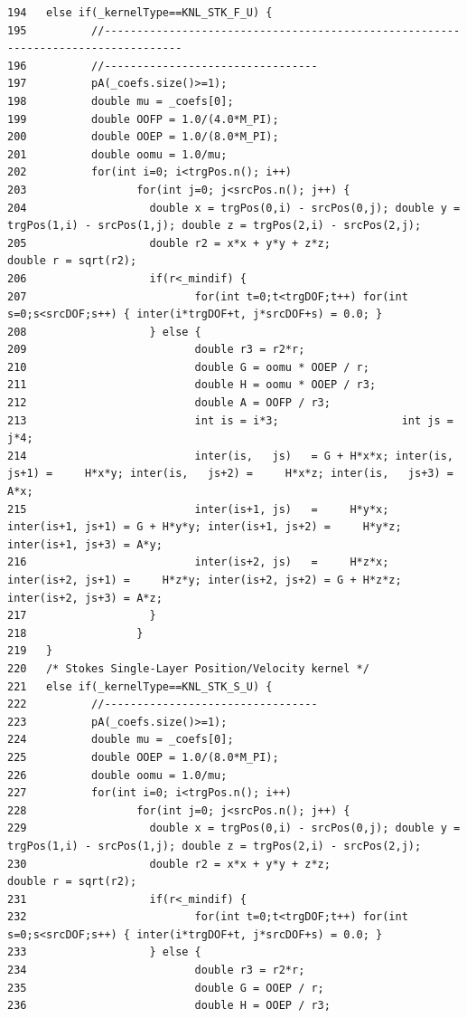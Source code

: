 \begin{verbatim}
194   else if(_kernelType==KNL_STK_F_U) {
195          //----------------------------------------------------------------------------------
196          //---------------------------------
197          pA(_coefs.size()>=1);
198          double mu = _coefs[0];
199          double OOFP = 1.0/(4.0*M_PI);
200          double OOEP = 1.0/(8.0*M_PI);
201          double oomu = 1.0/mu;
202          for(int i=0; i<trgPos.n(); i++)
203                 for(int j=0; j<srcPos.n(); j++) {
204                   double x = trgPos(0,i) - srcPos(0,j); double y = trgPos(1,i) - srcPos(1,j); double z = trgPos(2,i) - srcPos(2,j);
205                   double r2 = x*x + y*y + z*z;                    double r = sqrt(r2);
206                   if(r<_mindif) {
207                          for(int t=0;t<trgDOF;t++) for(int s=0;s<srcDOF;s++) { inter(i*trgDOF+t, j*srcDOF+s) = 0.0; }
208                   } else {
209                          double r3 = r2*r;
210                          double G = oomu * OOEP / r;
211                          double H = oomu * OOEP / r3;
212                          double A = OOFP / r3;
213                          int is = i*3;                   int js = j*4;
214                          inter(is,   js)   = G + H*x*x; inter(is,   js+1) =     H*x*y; inter(is,   js+2) =     H*x*z; inter(is,   js+3) = A*x;
215                          inter(is+1, js)   =     H*y*x; inter(is+1, js+1) = G + H*y*y; inter(is+1, js+2) =     H*y*z; inter(is+1, js+3) = A*y;
216                          inter(is+2, js)   =     H*z*x; inter(is+2, js+1) =     H*z*y; inter(is+2, js+2) = G + H*z*z; inter(is+2, js+3) = A*z;
217                   }
218                 }
219   }
220   /* Stokes Single-Layer Position/Velocity kernel */
221   else if(_kernelType==KNL_STK_S_U) {
222          //---------------------------------
223          pA(_coefs.size()>=1);
224          double mu = _coefs[0];
225          double OOEP = 1.0/(8.0*M_PI);
226          double oomu = 1.0/mu;
227          for(int i=0; i<trgPos.n(); i++)
228                 for(int j=0; j<srcPos.n(); j++) {
229                   double x = trgPos(0,i) - srcPos(0,j); double y = trgPos(1,i) - srcPos(1,j); double z = trgPos(2,i) - srcPos(2,j);
230                   double r2 = x*x + y*y + z*z;                    double r = sqrt(r2);
231                   if(r<_mindif) {
232                          for(int t=0;t<trgDOF;t++) for(int s=0;s<srcDOF;s++) { inter(i*trgDOF+t, j*srcDOF+s) = 0.0; }
233                   } else {
234                          double r3 = r2*r;
235                          double G = OOEP / r;
236                          double H = OOEP / r3;

\end{verbatim}
